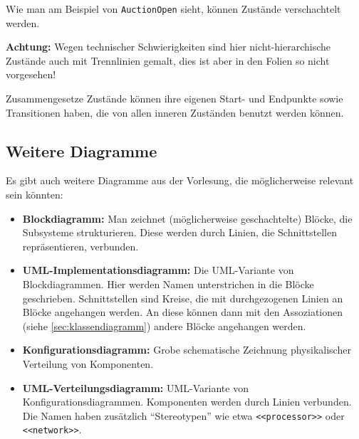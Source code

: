 \documentclass[a4paper,parskip=half*,DIV=7,fontsize=11pt]{scrartcl}
\begin{document}

Wie man am Beispiel von \lstinline{AuctionOpen} sieht, können Zustände verschachtelt werden.

\textbf{Achtung:} Wegen technischer Schwierigkeiten sind hier nicht-hierarchische Zustände auch mit Trennlinien gemalt, dies ist aber in den Folien so nicht vorgesehen!

Zusammengesetze Zustände können ihre eigenen Start- und Endpunkte sowie Transitionen haben, die von allen inneren Zuständen benutzt werden können.

\subsection{Weitere Diagramme}

Es gibt auch weitere Diagramme aus der Vorlesung, die möglicherweise relevant sein könnten: 

\begin{itemize}
\item \textbf{Blockdiagramm:} Man zeichnet (möglicherweise geschachtelte) Blöcke, die Subsysteme strukturieren. Diese werden durch Linien, die Schnittstellen repräsentieren, verbunden.
\item \textbf{UML-Implementationsdiagramm:} Die UML-Variante von Blockdiagrammen. Hier werden Namen unterstrichen in die Blöcke geschrieben. Schnittstellen sind Kreise, die mit durchgezogenen Linien an Blöcke angehangen werden. An diese können dann mit den Assoziationen (siehe \ref{sec:klassendiagramm}) andere Blöcke angehangen werden.
\item \textbf{Konfigurationsdiagramm:} Grobe schematische Zeichnung physikalischer Verteilung von Komponenten.
\item \textbf{UML-Verteilungsdiagramm:} UML-Variante von Konfigurationsdiagrammen. Komponenten werden durch Linien verbunden. Die Namen haben zusätzlich ``Stereotypen'' wie etwa \lstinline{<<processor>>} oder \lstinline{<<network>>}.
\end{itemize}
\end{document}
